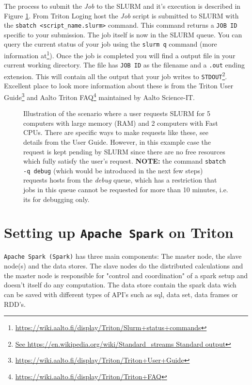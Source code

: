 \documentclass[a4paper,11pt]{article}
\begin{document}
The process to submit the \textit{Job} to the SLURM and it's execution is described in Figure \ref{fig:2}. From Triton Loging host the \textit{Job} script is submitted to SLURM with the \texttt{sbatch <script\_name.slurm>} command. This command returns a \texttt{JOB ID} specific to your submission. The job itself is now in the SLURM queue. You can query the current status of your job using the \texttt{slurm q} command (more information at\footnote{\url{https://wiki.aalto.fi/display/Triton/Slurm+status+commands}}). Once the job is completed you will find a output file in your current working directory. The file has \texttt{JOB ID} as the filename and a \texttt{.out} ending extension. This will contain all the output that your job writes to \texttt{STDOUT}\footnote{\url{See https://en.wikipedia.org/wiki/Standard\_streams Standard output}}.\\
Excellent place to look more information about these is from the Triton User Guide\footnote{\url{https://wiki.aalto.fi/display/Triton/Triton+User+Guide}} and  Aalto Triton FAQ\footnote{\url{https://wiki.aalto.fi/display/Triton/Triton+FAQ}} maintained by Aalto Science-IT.
\begin{figure}[ht]
    \centering
    \caption{Illustration of the scenario where a user requests SLURM for 5 computers with large memory (RAM) and 2 computers with Fast CPUs. There are specific ways to make requests like these, see details from the User Guide. However, in this example case the request is kept pending by SLURM since there are no free resources which fully satisfy the user's request. \textbf{NOTE:} the command \texttt{sbatch -q debug} (which would be introduced in the next few steps) requests hosts from the \textit{debug} queue, which has a restriction that jobs in this queue cannot be requested for more than 10 minutes, i.e. its for debugging only.}
    \label{fig:2}
\end{figure}

\section{Setting up \texttt{Apache Spark} on Triton}

\texttt{Apache Spark (Spark)} has three main components: The master node, the slave node(s) and the data stores. The slave nodes do the distributed calculations and the master node is responsible for "control and coordination" of a spark setup and doesn't itself do any computation. The data store contain the spark data wich can be saved with different types of API's such as sql, data set,  data frames or RDD's. 
\end{document}
